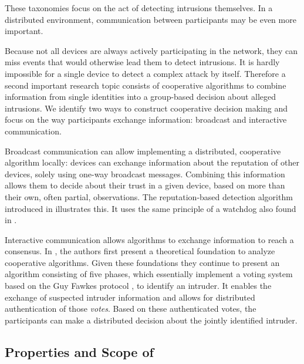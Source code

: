 \documentclass[conference]{IEEEtran}
\begin{document}
These taxonomies focus on the act of detecting intrusions themselves. In a
distributed environment, communication between participants may be even more
important.

Because not all devices are always actively participating in the network, they
can miss events that would otherwise lead them to detect intrusions. It is
hardly impossible for a single device to detect a complex attack by itself.
Therefore a second important research topic consists of cooperative algorithms
to combine information from single identities into a group-based decision about
alleged intrusions. We identify two ways to construct cooperative decision
making and focus on the way participants exchange information: broadcast and
interactive communication.

\begin{LaTeXdescription}

  \item[Broadcast communication] can allow implementing a distributed,
  cooperative algorithm locally: devices can exchange information about the
  reputation of other devices, solely using one-way broadcast messages.
  Combining this information allows them to decide about their trust in a given
  device, based on more than their own, often partial, observations. The
  reputation-based detection algorithm introduced in
  \cite{ganeriwal2008reputation} illustrates this. It uses the same principle
  of a watchdog also found in \cite{mishra2004intrusion}.

  \item[Interactive communication] allows algorithms to exchange information to
  reach a consensus. In \cite{krontiris2009cooperative}, the authors first
  present a theoretical foundation to analyze cooperative algorithms. Given
  these foundations they continue to present an algorithm consisting of five
  phases, which essentially implement a voting system based on the Guy Fawkes
  protocol \cite{anderson1998new}, to identify an intruder. It enables the
  exchange of suspected intruder information and allows for distributed
  authentication of those \emph{votes}. Based on these authenticated votes, the
  participants can make a distributed decision about the jointly identified
  intruder.

\end{LaTeXdescription}

\subsection{Properties and Scope of \NAME}
\label{scope}
\end{document}
